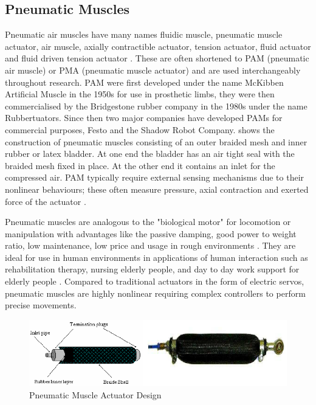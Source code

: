 \documentclass[11pt,a4paper]{article}
\begin{document}
\subsection{Pneumatic Muscles}
\label{sub:pneumatic_muscles}
Pneumatic air muscles have many names fluidic muscle, pneumatic muscle actuator, air muscle, axially contractible actuator, tension actuator, fluid actuator and fluid driven tension actuator \cite{najmuddin_mustaffa_2017} \cite{lau_chai_2012}. These are often shortened to PAM (pneumatic air muscle) or PMA (pneumatic muscle actuator) and are used interchangeably throughout research. PAM were first developed under the name McKibben Artificial Muscle in the 1950s for use in prosthetic limbs, they were then commercialised by the Bridgestone rubber company in the 1980s under the name Rubbertuators. Since then two major companies have developed PAMs for commercial purposes, Festo and the Shadow Robot Company.  shows the construction of pneumatic muscles consisting of an outer braided mesh and inner rubber or latex bladder. At one end the bladder has an air tight seal with the braided mesh fixed in place. At the other end it contains an inlet for the compressed air. PAM typically require external sensing mechanisms due to their nonlinear behaviours; these often measure pressure, axial contraction and exerted force of the actuator \cite{erin_pol_valle_park_2016}. \newline

Pneumatic muscles are analogous to the "biological motor" for locomotion or manipulation with advantages like the passive damping, good power to weight ratio, low maintenance, low price and usage in rough environments \cite{ranjan_upadhyay_kumar_dhyani_2012}. They are ideal for use in human environments in applications of human interaction such as rehabilitation therapy, nursing elderly people, and day to day work support for elderly people \cite{saga_nagase_saikawa_2006}. Compared to traditional actuators in the form of electric servos, pneumatic muscles are highly nonlinear requiring complex controllers to perform precise movements. \newline

\begin{figure}[ht!]
    \centering
    \includegraphics[scale=0.6]{Pneumatic-Muscle-Actuator-Design.png}
    \caption{Pneumatic Muscle Actuator Design \cite{pneumatic_image}}
    \label{fig:pneumatic_design}
\end{figure}
\end{document}
